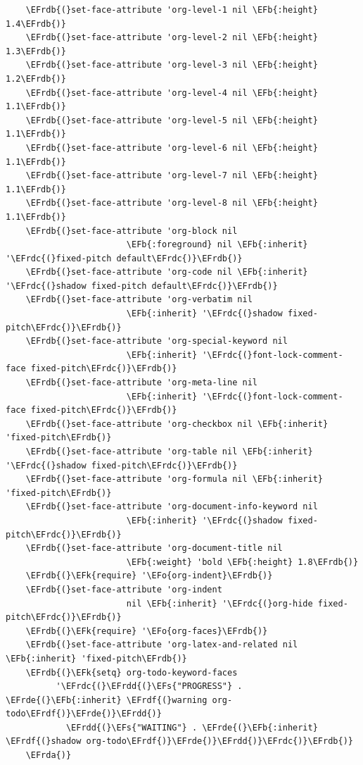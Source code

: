 \documentclass[11pt]{article}
\newcommand{\EFs}[1]{\textcolor{EFs}{#1}} %
\newcommand{\EFk}[1]{\textcolor{EFk}{#1}} %
\newcommand{\EFb}[1]{\textcolor{EFb}{#1}} %
\newcommand{\EFo}[1]{\textcolor{EFo}{#1}} %
\newcommand{\EFrda}[1]{\textcolor{EFrda}{#1}} %
\newcommand{\EFrdb}[1]{\textcolor{EFrdb}{#1}} %
\newcommand{\EFrdc}[1]{\textcolor{EFrdc}{#1}} %
\newcommand{\EFrdd}[1]{\textcolor{EFrdd}{#1}} %
\newcommand{\EFrde}[1]{\textcolor{EFrde}{#1}} %
\newcommand{\EFrdf}[1]{\textcolor{EFrdf}{#1}} %
\begin{document}
\begin{Code}
\begin{Verbatim}
    \EFrdb{(}set-face-attribute 'org-level-1 nil \EFb{:height} 1.4\EFrdb{)}
    \EFrdb{(}set-face-attribute 'org-level-2 nil \EFb{:height} 1.3\EFrdb{)}
    \EFrdb{(}set-face-attribute 'org-level-3 nil \EFb{:height} 1.2\EFrdb{)}
    \EFrdb{(}set-face-attribute 'org-level-4 nil \EFb{:height} 1.1\EFrdb{)}
    \EFrdb{(}set-face-attribute 'org-level-5 nil \EFb{:height} 1.1\EFrdb{)}
    \EFrdb{(}set-face-attribute 'org-level-6 nil \EFb{:height} 1.1\EFrdb{)}
    \EFrdb{(}set-face-attribute 'org-level-7 nil \EFb{:height} 1.1\EFrdb{)}
    \EFrdb{(}set-face-attribute 'org-level-8 nil \EFb{:height} 1.1\EFrdb{)}
    \EFrdb{(}set-face-attribute 'org-block nil
                        \EFb{:foreground} nil \EFb{:inherit} '\EFrdc{(}fixed-pitch default\EFrdc{)}\EFrdb{)}
    \EFrdb{(}set-face-attribute 'org-code nil \EFb{:inherit} '\EFrdc{(}shadow fixed-pitch default\EFrdc{)}\EFrdb{)}
    \EFrdb{(}set-face-attribute 'org-verbatim nil
                        \EFb{:inherit} '\EFrdc{(}shadow fixed-pitch\EFrdc{)}\EFrdb{)}
    \EFrdb{(}set-face-attribute 'org-special-keyword nil
                        \EFb{:inherit} '\EFrdc{(}font-lock-comment-face fixed-pitch\EFrdc{)}\EFrdb{)}
    \EFrdb{(}set-face-attribute 'org-meta-line nil
                        \EFb{:inherit} '\EFrdc{(}font-lock-comment-face fixed-pitch\EFrdc{)}\EFrdb{)}
    \EFrdb{(}set-face-attribute 'org-checkbox nil \EFb{:inherit} 'fixed-pitch\EFrdb{)}
    \EFrdb{(}set-face-attribute 'org-table nil \EFb{:inherit} '\EFrdc{(}shadow fixed-pitch\EFrdc{)}\EFrdb{)}
    \EFrdb{(}set-face-attribute 'org-formula nil \EFb{:inherit} 'fixed-pitch\EFrdb{)}
    \EFrdb{(}set-face-attribute 'org-document-info-keyword nil
                        \EFb{:inherit} '\EFrdc{(}shadow fixed-pitch\EFrdc{)}\EFrdb{)}
    \EFrdb{(}set-face-attribute 'org-document-title nil
                        \EFb{:weight} 'bold \EFb{:height} 1.8\EFrdb{)}
    \EFrdb{(}\EFk{require} '\EFo{org-indent}\EFrdb{)}
    \EFrdb{(}set-face-attribute 'org-indent
                        nil \EFb{:inherit} '\EFrdc{(}org-hide fixed-pitch\EFrdc{)}\EFrdb{)}
    \EFrdb{(}\EFk{require} '\EFo{org-faces}\EFrdb{)}
    \EFrdb{(}set-face-attribute 'org-latex-and-related nil \EFb{:inherit} 'fixed-pitch\EFrdb{)}
    \EFrdb{(}\EFk{setq} org-todo-keyword-faces
          '\EFrdc{(}\EFrdd{(}\EFs{"PROGRESS"} . \EFrde{(}\EFb{:inherit} \EFrdf{(}warning org-todo\EFrdf{)}\EFrde{)}\EFrdd{)}
            \EFrdd{(}\EFs{"WAITING"} . \EFrde{(}\EFb{:inherit} \EFrdf{(}shadow org-todo\EFrdf{)}\EFrde{)}\EFrdd{)}\EFrdc{)}\EFrdb{)}
    \EFrda{)}
\end{Verbatim}
\end{Code}
\end{document}
